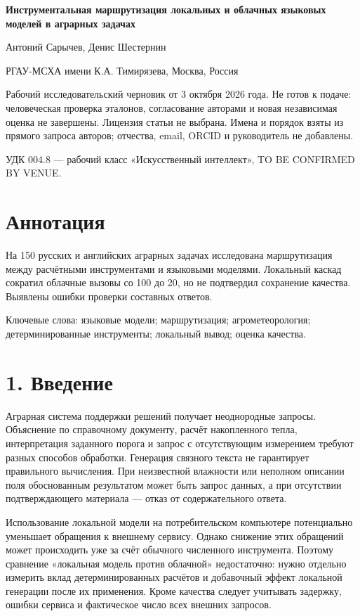 \documentclass[14pt,a4paper]{extarticle}
\begin{document}
\begin{center}\bfseries
Инструментальная маршрутизация локальных и облачных языковых моделей в аграрных задачах
\end{center}

Антоний Сарычев, Денис Шестернин


РГАУ-МСХА имени К.А. Тимирязева, Москва, Россия


Рабочий исследовательский черновик от 3 октября 2026 года. Не готов к подаче: человеческая проверка эталонов, согласование авторами и новая независимая оценка не завершены. Лицензия статьи не выбрана. Имена и порядок взяты из прямого запроса авторов; отчества, email, ORCID и руководитель не добавлены.


УДК 004.8 --- рабочий класс «Искусственный интеллект», TO BE CONFIRMED BY VENUE.


\section*{Аннотация}

На 150 русских и английских аграрных задачах исследована маршрутизация между расчётными инструментами и языковыми моделями. Локальный каскад сократил облачные вызовы со 100 до 20, но не подтвердил сохранение качества. Выявлены ошибки проверки составных ответов.


Ключевые слова: языковые модели; маршрутизация; агрометеорология; детерминированные инструменты; локальный вывод; оценка качества.


\section*{1. Введение}

Аграрная система поддержки решений получает неоднородные запросы. Объяснение по справочному документу, расчёт накопленного тепла, интерпретация заданного порога и запрос с отсутствующим измерением требуют разных способов обработки. Генерация связного текста не гарантирует правильного вычисления. При неизвестной влажности или неполном описании поля обоснованным результатом может быть запрос данных, а при отсутствии подтверждающего материала --- отказ от содержательного ответа.


Использование локальной модели на потребительском компьютере потенциально уменьшает обращения к внешнему сервису. Однако снижение этих обращений может происходить уже за счёт обычного численного инструмента. Поэтому сравнение «локальная модель против облачной» недостаточно: нужно отдельно измерить вклад детерминированных расчётов и добавочный эффект локальной генерации после их применения. Кроме качества следует учитывать задержку, ошибки сервиса и фактическое число всех внешних запросов.
\end{document}
